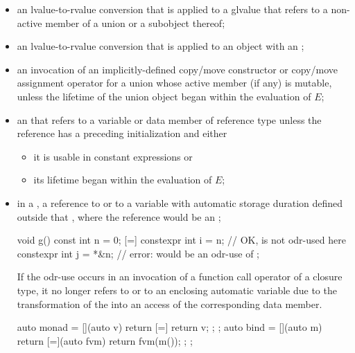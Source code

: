 \begin{itemize}
\begin{itemize}
  \item
  a non-volatile glvalue of literal type that refers to a non-volatile object
  whose lifetime began within the evaluation of $E$;
\end{itemize}

\item
an lvalue-to-rvalue conversion
that is applied to a glvalue
that refers to a non-active member of a union or a subobject thereof;

\item
an lvalue-to-rvalue conversion that is applied to
an object with an ;

\item
an invocation of an implicitly-defined copy/move constructor or
copy/move assignment operator
for a union whose active member (if any) is mutable,
unless the lifetime of the union object began within the evaluation of $E$;

\item
an  that refers to a variable or
data member of reference type
unless the reference has a preceding initialization and either
\begin{itemize}
  \item
  it is usable in constant expressions or

  \item
  its lifetime began within the evaluation of $E$;
\end{itemize}

\item
in a ,
a reference to  or to a variable with
automatic storage duration defined outside that
, where
the reference would be an ;
\begin{example}
\begin{codeblock}
void g() {
  const int n = 0;
  [=] {
    constexpr int i = n;        // OK,  is not odr-used here
    constexpr int j = *&n;      // error:  would be an odr-use of 
  };
}
\end{codeblock}
\end{example}
\begin{note}
If the odr-use occurs in an invocation
of a function call operator of a closure type,
it no longer refers to  or to an enclosing automatic variable
due to the transformation
of the  into
an access of the corresponding data member.
\begin{example}
\begin{codeblock}
auto monad = [](auto v) { return [=] { return v; }; };
auto bind = [](auto m) {
  return [=](auto fvm) { return fvm(m()); };
};


\end{codeblock}
\end{example}
\end{note}
\end{itemize}
